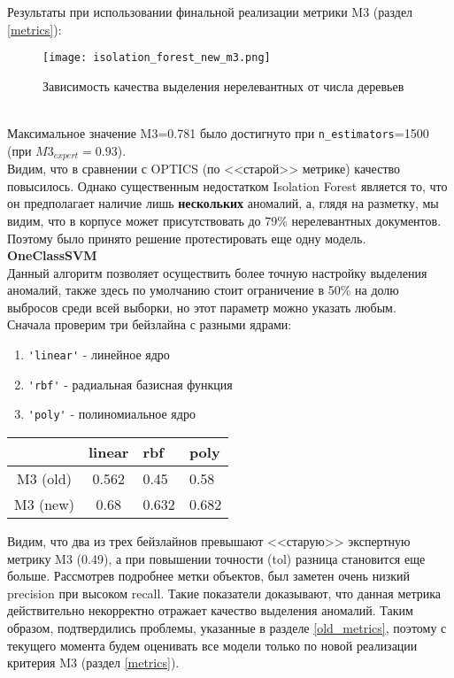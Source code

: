 \documentclass{article}
\begin{document}
Результаты при использовании финальной реализации метрики M3 (раздел \textcolor{cyan}{\ref{metrics}}):
\begin{figure}[!htb]
    \center
        \texttt{[image: isolation\_forest\_new\_m3.png]}
        \caption{Зависимость качества выделения нерелевантных от числа деревьев}
\end{figure}\\
Максимальное значение M3=0.781 было достигнуто при \verb|n_estimators|=1500 (при $M3_{expert}=0.93$).\\

Видим, что в сравнении с OPTICS (по <<старой>> метрике) качество повысилось. Однако существенным недостатком Isolation Forest является то, что он предполагает наличие лишь \textbf{нескольких} аномалий, а, глядя на разметку, мы видим, что в корпусе может присутствовать до 79\% нерелевантных документов. Поэтому было принято решение протестировать еще одну модель.\\

\textbf{OneClassSVM}\\
Данный алгоритм позволяет осуществить более точную настройку выделения аномалий, также здесь по умолчанию стоит ограничение в 50\% на долю выбросов среди всей выборки, но этот параметр можно указать любым.\\

Сначала проверим три бейзлайна с разными ядрами:
\begin{enumerate}
    \item \verb|'linear'| - линейное ядро
    \item \verb|'rbf'| - радиальная базисная функция
    \item \verb|'poly'| - полиномиальное ядро
\end{enumerate}

\begin{table}[!htb]
    \center
    \begin{tabular}{|c|c|l|l|}
    \hline
             & linear & rbf   & poly  \\ \hline
    M3 (old) & 0.562  & 0.45  & 0.58  \\ \hline
    M3 (new) & 0.68   & 0.632 & 0.682 \\ \hline
    \end{tabular}
\end{table}
 Видим, что два из трех бейзлайнов превышают <<старую>> экспертную метрику M3 (0.49), а при повышении точности (tol) разница становится еще больше. Рассмотрев подробнее метки объектов, был заметен очень низкий precision при высоком recall. Такие показатели доказывают, что данная метрика действительно некорректно отражает качество выделения аномалий. Таким образом, подтвердились проблемы, указанные в разделе \textcolor{cyan}{\ref{old_metrics}}, поэтому с текущего момента будем оценивать все модели только по новой реализации критерия M3 (раздел \textcolor{cyan}{\ref{metrics}}).\\
\end{document}
